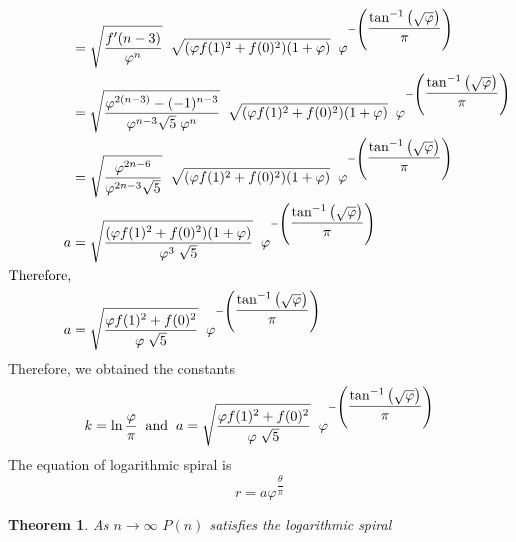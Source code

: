 \documentclass{article}
\newtheorem{theorem}{Theorem}[section]
\begin{document}
\begin{align*}
	&= \sqrt{\dfrac{f'(n-3)}{\varphi^n}}\hspace{2mm}\sqrt{(\varphi f(1)^2 + f(0)^2)(1+\varphi)}\hspace{2mm}\varphi^{-\left(\dfrac{ \tan^{-1}{\left(\sqrt{\varphi}\right)}}{\pi}\right)}\\
	&= \sqrt{\dfrac{\varphi^{2(n-3)}-(-1)^{n-3}}{\varphi^{n-3}\sqrt{5}\hspace{1mm}\varphi^n}}\hspace{2mm}\sqrt{(\varphi f(1)^2 + f(0)^2)(1+\varphi)}\hspace{2mm}\varphi^{-\left(\dfrac{ \tan^{-1}{\left(\sqrt{\varphi}\right)}}{\pi}\right)}\\
	&= \sqrt{\dfrac{\varphi^{2n-6}}{\varphi^{2n-3}\sqrt{5}}}\hspace{2mm}\sqrt{(\varphi f(1)^2 + f(0)^2)(1+\varphi)}\hspace{2mm}\varphi^{-\left(\dfrac{ \tan^{-1}{\left(\sqrt{\varphi}\right)}}{\pi}\right)}\\
	a &= \sqrt{\dfrac{(\varphi f(1)^2 + f(0)^2)(1+\varphi)}{\varphi^3\hspace{1mm}\sqrt{5}}}\hspace{2mm}\varphi^{-\left(\dfrac{ \tan^{-1}{\left(\sqrt{\varphi}\right)}}{\pi}\right)}\\
	\text{Therefore,}\\
	a &= \sqrt{\dfrac{\varphi f(1)^2 + f(0)^2}{\varphi\hspace{1mm}\sqrt{5}}}\hspace{2mm}\varphi^{-\left(\dfrac{ \tan^{-1}{\left(\sqrt{\varphi}\right)}}{\pi}\right)}
\end{align*}
Therefore, we obtained the constants $$k = \ln{\dfrac{\varphi}{\pi}} \hspace{2mm}\text{and}\hspace{2mm}a=\sqrt{\dfrac{\varphi f(1)^2 + f(0)^2}{\varphi\hspace{1mm}\sqrt{5}}}\hspace{2mm}\varphi^{-\left(\dfrac{ \tan^{-1}{\left(\sqrt{\varphi}\right)}}{\pi}\right)}$$
The equation of logarithmic spiral is $$r = a\varphi^{\dfrac{\theta}{\pi}}$$
\begin{theorem}
	As $n \to \infty$ $P(n)$ satisfies the logarithmic spiral
\end{theorem}
\end{document}
